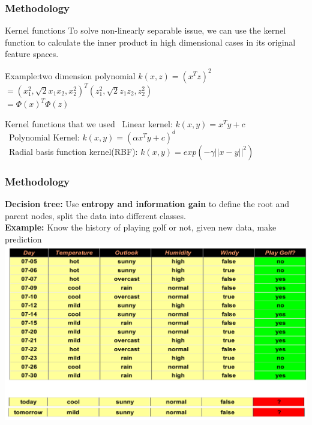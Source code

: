 \documentclass[xcolor={x11names,svgnames,dvipsnames}]{beamer}
\begin{document}
\begin{frame}
\frametitle{Methodology}
\begin{block}{Kernel functions}
To solve non-linearly separable issue, we can use the kernel function to calculate the inner product in high dimensional cases in its original feature spaces.
\end{block}
\begin{block}{Example:two dimension polynomial}
$k(x,z)=(x^Tz)^2$\\
$=(x_1^2,\sqrt{2}x_1x_2,x_2^2)^T(z_1^2,\sqrt{2}z_1z_2,z_2^2)$\\
$=\Phi(x)^T\Phi(z)$\\
\end{block}
\begin{block}{Kernel functions that we used}
\small{
\textbullet\ {Linear kernel:  $k(x,y)=x^Ty+c$}\\
\textbullet\ {Polynomial Kernel:  $k(x,y)=(\alpha x^Ty+c)^d$}\\
\textbullet\ {Radial basis function kernel(RBF):  $k(x,y)=exp(-\gamma||x-y||^2)$}
}
\end{block}
\end{frame}

\begin{frame}
\frametitle{Methodology}
\textbf{Decision tree:}
Use \textbf{entropy and information gain} to define the root and parent nodes, split the data into different classes.\\
\textbf{Example:}
Know the history of playing golf or not, given new data, make prediction\\ 
      \includegraphics[width=1\textwidth, height=0.7\textheight]{decision_tree1.png}
\end{frame}
\end{document}
